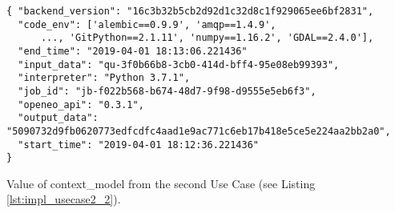 \documentclass[draft,final]{vutinfth} %
\newenvironment{code}{\captionsetup{type=listing}}{}
\begin{document}
\begin{code}
	\begin{verbatim}
{ "backend_version": "16c3b32b5cb2d92d1c32d8c1f929065ee6bf2831", 
  "code_env": ['alembic==0.9.9', 'amqp==1.4.9',
      ..., 'GitPython==2.1.11', 'numpy==1.16.2', 'GDAL==2.4.0'],
  "end_time": "2019-04-01 18:13:06.221436" 
  "input_data": "qu-3f0b66b8-3cb0-414d-bff4-95e08eb99393", 
  "interpreter": "Python 3.7.1", 
  "job_id": "jb-f022b568-b674-48d7-9f98-d9555e5eb6f3", 
  "openeo_api": "0.3.1",
  "output_data": "5090732d9fb0620773edfcdfc4aad1e9ac771c6eb17b418e5ce5e224aa2bb2a0", 
  "start_time": "2019-04-01 18:12:36.221436" 
}
	\end{verbatim}
	\caption{Value of context\_model from the second Use Case (see Listing \ref{lst:impl_usecase2_2}).}
	\label{lst:use_case2_logfile}
\end{code}
\newpage
\end{document}

